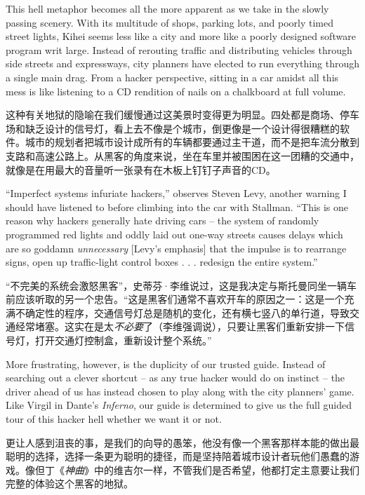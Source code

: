 \ifdefined\eng
This hell metaphor becomes all the more apparent as we take in the slowly passing scenery. With its multitude of shops, parking lots, and poorly timed street lights, Kihei seems less like a city and more like a poorly designed software program writ large. Instead of rerouting traffic and distributing vehicles through side streets and expressways, city planners have elected to run everything through a single main drag. From a hacker perspective, sitting in a car amidst all this mess is like listening to a CD rendition of nails on a chalkboard at full volume.
\fi

\ifdefined\chs
这种有关地狱的隐喻在我们缓慢通过这美景时变得更为明显。四处都是商场、停车场和缺乏设计的信号灯，看上去不像是个城市，倒更像是一个设计得很糟糕的软件。城市的规划者把城市设计成所有的车辆都要通过主干道，而不是把车流分散到支路和高速公路上。从黑客的角度来说，坐在车里并被围困在这一团糟的交通中，就像是在用最大的音量听一张录有在木板上钉钉子声音的CD。
\fi

\ifdefined\eng
``Imperfect systems infuriate hackers,'' observes Steven Levy, another warning I should have listened to before climbing into the car with Stallman. ``This is one reason why hackers generally hate driving cars -- the system of randomly programmed red lights and oddly laid out one-way streets causes delays which are so goddamn \textit{unnecessary} [Levy's emphasis] that the impulse is to rearrange signs, open up traffic-light control boxes . . . redesign the entire system.''
\fi

\ifdefined\chs
“不完美的系统会激怒黑客”，史蒂芬·李维说过，这是我决定与斯托曼同坐一辆车前应该听取的另一个忠告。“这是黑客们通常不喜欢开车的原因之一：这是一个充满不确定性的程序，交通信号灯总是随机的变化，还有横七竖八的单行道，导致交通经常堵塞。这实在是太\textit{不必要}了（李维强调说），只要让黑客们重新安排一下信号灯，打开交通灯控制盒，重新设计整个系统。” 
\fi

\ifdefined\eng
More frustrating, however, is the duplicity of our trusted guide. Instead of searching out a clever shortcut -- as any true hacker would do on instinct -- the driver ahead of us has instead chosen to play along with the city planners' game. Like Virgil in Dante's \textit{Inferno}, our guide is determined to give us the full guided tour of this hacker hell whether we want it or not.
\fi

\ifdefined\chs
更让人感到沮丧的事，是我们的向导的愚笨，他没有像一个黑客那样本能的做出最聪明的选择，选择一条更为聪明的捷径，而是坚持陪着城市设计者玩他们愚蠢的游戏。像但丁《\textit{神曲}》中的维吉尔一样，不管我们是否希望，他都打定主意要让我们完整的体验这个黑客的地狱。
\fi

